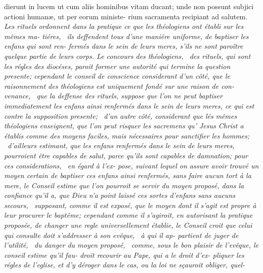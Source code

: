 \documentclass{article}
\begin{document}
\newpage
\bgroup\fontsize{9}{13}\selectfont\noindent
dierunt in lucem ut cum aliis hominibus\break
vitam ducant; unde non possunt subjici\break
actioni humanæ, ut per eorum ministe-\break
rium sacramenta recipiant ad salutem.\break
\fontsize{9}{13}\selectfont\itshape Les rituels ordonnent dans la
pratique ce que\break
les théologiens ont établi sur les mêmes ma-\break
tiéres, \et\  ils deffendent tous d’une maniére\break
uniforme, de baptiser les enfans qui sont ren-\break
fermés dans le sein de leurs meres, s’ils ne\break
sont paroître quelque partie de leurs corps.\break 
Le concours des théologiens, \et\  des rituels,\break
qui sont les régles des diocéses, paroit former\break
une autorité qui termine la question presente;\break
cependant le conseil de conscience considerant\break
d’un côté, que le raisonnement des théologiens\break
est uniquement fondé sur une raison de con-\break
venance, \et\  que la deffense des rituels, suppose\break
que l’on ne peut baptiser immediatement les\break
enfans ainsi renfermés dans le sein de leurs\break
meres, ce qui est contre la supposition presente;\break
\et\  d’un autre côté, considerant que lés mêmes
théologiens enseignent, que l’on peut risquer\break
les sacremens qu’ {\upshape Jesus Christ} a établis comme\break
des moyens faciles, mais nécessaires pour\break 
sanctifier les hommes; \et\  d’ailleurs estimant,\break
que les enfans renfermés dans le sein de leurs\break
meres, pourroient être capables de salut,\break
parce qu’ils sont capables de damnation;\tsk\break  
pour ces considerations, \et\  en égard à l’ex-\break
pose, suivant lequel on assure avoir trouvé\break
un moyen certain de baptiser ces enfans ainsi\break
renfermés, sans faire aucun tort à la mere,\break
le Conseil estime que l’on pourroit se servir du\break
moyen proposé, dans la confiance qu’il a, que\break
Dieu n’a point laissé ces sortes d’enfans\break
sans aucuns secours, \et\  supposant, comme\break
il est exposé, que le moyen dont il s’agit est\break
propre à leur procurer le baptême; cependant\break
comme il s’agiroit, en autorisant la pratique\break
proposée, de changer une regle universellement\break
établie, le Conseil croit que celui qui consulte\break
doit s’addresser à son evêque, \et\  à qui il ap-
partient de juger de l’utilité, \et\  du danger\break
du moyen proposé, \et\  comme, sous le bon\break
plaisir de l’evêque, le conseil estime qu’il fau-\break
droit recourir au Pape, qui a le droit d’ex-\break
pliquer les régles de l’eglise, et d’y déroger\break
dans le cas, ou la loi ne sçauroit obliger, quel-\break
\end{document}
